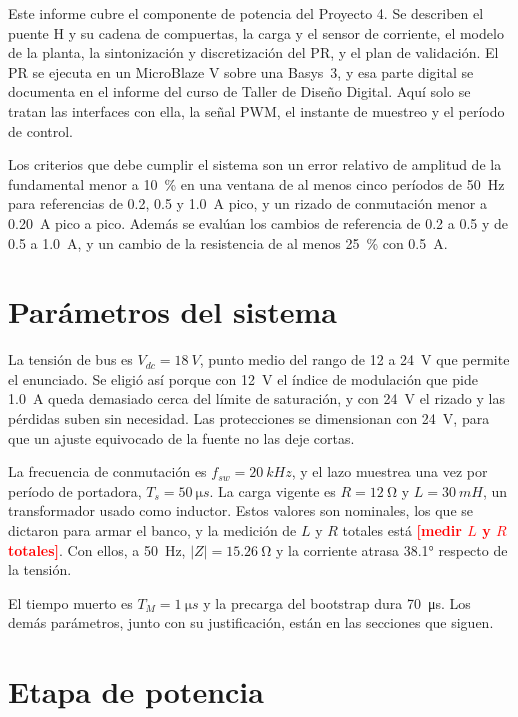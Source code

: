 \documentclass[journal]{IEEEtran}
\newcommand{\pendiente}[1]{\textcolor{red}{\textbf{[#1]}}}
\begin{document}
Este informe cubre el componente de potencia del Proyecto 4. Se describen el puente H y su cadena de compuertas, la carga y el sensor de corriente, el modelo de la planta, la sintonización y discretización del PR, y el plan de validación. El PR se ejecuta en un MicroBlaze V sobre una Basys~3, y esa parte digital se documenta en el informe del curso de Taller de Diseño Digital. Aquí solo se tratan las interfaces con ella, la señal PWM, el instante de muestreo y el período de control.

Los criterios que debe cumplir el sistema son un error relativo de amplitud de la fundamental menor a \SI{10}{\percent} en una ventana de al menos cinco períodos de \SI{50}{Hz} para referencias de \num{0.2}, \num{0.5} y \SI{1.0}{A} pico, y un rizado de conmutación menor a \SI{0.20}{A} pico a pico. Además se evalúan los cambios de referencia de \num{0.2} a \num{0.5} y de \num{0.5} a \SI{1.0}{A}, y un cambio de la resistencia de al menos \SI{25}{\percent} con \SI{0.5}{A}.

\section{Parámetros del sistema}
\label{sec:param}
La tensión de bus es $V_{dc}=\SI{18}{V}$, punto medio del rango de \num{12} a \SI{24}{V} que permite el enunciado. Se eligió así porque con \SI{12}{V} el índice de modulación que pide \SI{1.0}{A} queda demasiado cerca del límite de saturación, y con \SI{24}{V} el rizado y las pérdidas suben sin necesidad. Las protecciones se dimensionan con \SI{24}{V}, para que un ajuste equivocado de la fuente no las deje cortas.

La frecuencia de conmutación es $f_{sw}=\SI{20}{kHz}$, y el lazo muestrea una vez por período de portadora, $T_s=\SI{50}{\micro s}$. La carga vigente es $R=\SI{12}{\ohm}$ y $L=\SI{30}{mH}$, un transformador usado como inductor. Estos valores son nominales, los que se dictaron para armar el banco, y la medición de $L$ y $R$ totales está \pendiente{medir $L$ y $R$ totales}. Con ellos, a \SI{50}{Hz}, $|Z|=\SI{15.26}{\ohm}$ y la corriente atrasa \ang{38.1} respecto de la tensión.

El tiempo muerto es $T_M=\SI{1}{\micro s}$ y la precarga del bootstrap dura \SI{70}{\micro s}. Los demás parámetros, junto con su justificación, están en las secciones que siguen.

\section{Etapa de potencia}
\label{sec:potencia}
\end{document}
